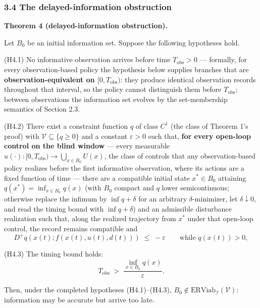 \documentclass[11pt]{article}
\begin{document}
\subsubsection{3.4 The delayed-information
obstruction}\label{the-delayed-information-obstruction}

\textbf{Theorem 4 (delayed-information obstruction).}

Let \(B_0\) be an initial information set. Suppose the following
hypotheses hold.

(H4.1) No informative observation arrives before time
\(T_{\mathrm{obs}} > 0\) --- formally, for every observation-based
policy the hypothesis below supplies branches that are
\textbf{observation-equivalent on \([0, T_{\mathrm{obs}})\)}: they
produce identical observation records throughout that interval, so the
policy cannot distinguish them before \(T_{\mathrm{obs}}\); between
observations the information set evolves by the set-membership semantics
of Section 2.3.

(H4.2) There exist a constraint function \(q\) of class \(C^1\) (the
class of Theorem 1's proof) with \(\mathcal{V} \subseteq \{ q \ge 0 \}\)
and a constant \(\varepsilon > 0\) such that, \textbf{for every
open-loop control on the blind window} --- every measurable
\(u(\cdot) : [0, T_{\mathrm{obs}}) \to \bigcup_{x \in B_0} U(x)\), the
class of controls that any observation-based policy realizes before the
first informative observation, where its actions are a fixed function of
time --- there are a compatible initial state \(x^* \in B_0\) attaining
\(q(x^*) = \inf_{x \in B_0} q(x)\) (with \(B_0\) compact and \(q\) lower
semicontinuous; otherwise replace the infimum by \(\inf q + \delta\) for
an arbitrary \(\delta\)-minimizer, let \(\delta \downarrow 0\), and read
the timing bound with \(\inf q + \delta\)) and an admissible disturbance
realization such that, along the realized trajectory from \(x^*\) under
that open-loop control, the record remains compatible and
\[D^+ q(x(t); f(x(t), u(t), d(t))) \;\le\; -\varepsilon \qquad \text{while } q(x(t)) > 0, \tag{3}\]

(H4.3) The timing bound holds:
\[T_{\mathrm{obs}} \;>\; \frac{\inf_{x \in B_0} q(x)}{\varepsilon}. \tag{4}\]

Then, under the completed hypotheses (H4.1)--(H4.3),
\(B_0 \notin \mathrm{ERViab}_{\mathcal{I}}(\mathcal{V})\): information
may be accurate but arrive too late.
\end{document}
